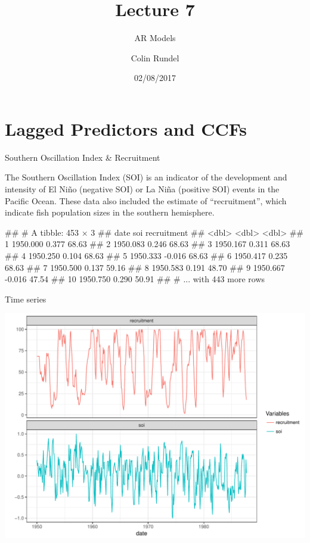\documentclass[11pt,ignorenonframetext,]{beamer}
\title{Lecture 7}
\subtitle{AR Models}
\author{Colin Rundel}
\date{02/08/2017}
\let\oldverbatim\verbatim
\let\endoldverbatim\endverbatim
\renewenvironment{verbatim}{\footnotesize\begin{spacing}{0.9}\oldverbatim}{\endoldverbatim\end{spacing}}
\begin{document}
\frame{\titlepage}

\section{Lagged Predictors and CCFs}\label{lagged-predictors-and-ccfs}

\begin{frame}[fragile]{Southern Oscillation Index \& Recruitment}

The Southern Oscillation Index (SOI) is an indicator of the development
and intensity of El Niño (negative SOI) or La Niña (positive SOI) events
in the Pacific Ocean. These data also included the estimate of
``recruitment'', which indicate fish population sizes in the southern
hemisphere.

\begin{verbatim}
## # A tibble: 453 × 3
##        date    soi recruitment
##       <dbl>  <dbl>       <dbl>
## 1  1950.000  0.377       68.63
## 2  1950.083  0.246       68.63
## 3  1950.167  0.311       68.63
## 4  1950.250  0.104       68.63
## 5  1950.333 -0.016       68.63
## 6  1950.417  0.235       68.63
## 7  1950.500  0.137       59.16
## 8  1950.583  0.191       48.70
## 9  1950.667 -0.016       47.54
## 10 1950.750  0.290       50.91
## # ... with 443 more rows
\end{verbatim}

\end{frame}

\begin{frame}{Time series}

\includegraphics{Lec7_files/figure-beamer/unnamed-chunk-2-1.pdf}

\end{frame}
\end{document}
